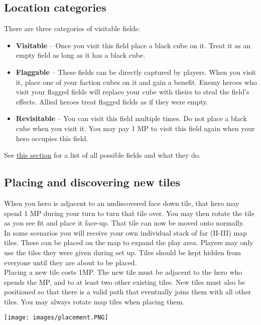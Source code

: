 \documentclass[12pt]{article}
\begin{document}
\clearpage
\subsection*{\hypertarget{Categories}{Location categories}}
There are three categories of visitable fields:
\begin{itemize}
    \item \textbf{Visitable} – Once you visit this field place a black cube on it. Treat it as an empty field as long as it has a black cube.
    \item \textbf{Flaggable} – These fields can be directly captured by players. When you visit it, place one of your faction cubes on it and gain a benefit. Enemy heroes who visit your flagged fields will replace your cube with theirs to steal the field’s effects. Allied heroes treat flagged fields as if they were empty.
    \item \textbf{Revisitable} – You can visit this field multiple times. Do not place a black cube when you visit it. You may pay 1 MP to visit this field again when your hero occupies this field.
\end{itemize}

See \hyperlink{All}{this section} for a list of all possible fields and what they do.
\subsection*{\hypertarget{Placing}{Placing and discovering new tiles}}
When you hero is adjacent to an undiscovered face down tile, that hero may spend 1 MP during your turn to turn that tile over. You may then rotate the tile as you see fit and place it face-up. That tile can now be moved onto normally.\\[6pt]
In some scenarios you will receive your own individual stack of far (II-III) map tiles. These can be placed on the map to expand the play area. Players may only use the tiles they were given during set up. Tiles should be kept hidden from everyone until they are about to be placed.\\[6pt]
Placing a new tile costs 1MP. The new tile must be adjacent to the hero who spends the MP, and to at least two other existing tiles. New tiles must also be positioned so that there is a valid path that eventually joins them with all other tiles. You may always rotate map tiles when placing them.\\[6pt]
\begin{center}
    \texttt{[image: images/placement.PNG]}
\end{center}
\end{document}
